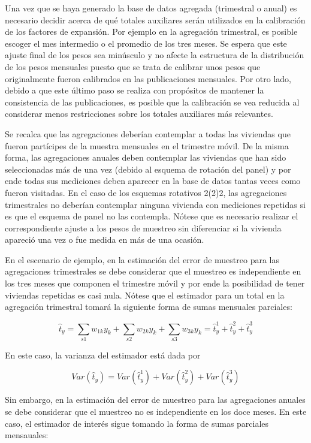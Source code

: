 \documentclass[
  10pt,
  spanish,
]{book}
\begin{document}
Una vez que se haya generado la base de datos agregada (trimestral o
anual) es necesario decidir acerca de qué totales auxiliares serán
utilizados en la calibración de los factores de expansión. Por ejemplo
en la agregación trimestral, es posible escoger el mes intermedio o el
promedio de los tres meses. Se espera que este ajuste final de los pesos
sea minúsculo y no afecte la estructura de la distribución de los pesos
mensuales puesto que se trata de calibrar unos pesos que originalmente
fueron calibrados en las publicaciones mensuales. Por otro lado, debido
a que este último paso se realiza con propósitos de mantener la
consistencia de las publicaciones, es posible que la calibración se vea
reducida al considerar menos restricciones sobre los totales auxiliares
más relevantes.

Se recalca que las agregaciones deberían contemplar a todas las
viviendas que fueron partícipes de la muestra mensuales en el trimestre
móvil. De la misma forma, las agregaciones anuales deben contemplar las
viviendas que han sido seleccionadas más de una vez (debido al esquema
de rotación del panel) y por ende todas sus mediciones deben aparecer en
la base de datos tantas veces como fueron visitadas. En el caso de los
esquemas rotativos 2(2)2, las agregaciones trimestrales no deberían
contemplar ninguna vivienda con mediciones repetidas si es que el
esquema de panel no las contempla. Nótese que es necesario realizar el
correspondiente ajuste a los pesos de muestreo sin diferenciar si la
vivienda apareció una vez o fue medida en más de una ocasión.

En el escenario de ejemplo, en la estimación del error de muestreo para
las agregaciones trimestrales se debe considerar que el muestreo es
independiente en los tres meses que componen el trimestre móvil y por
ende la posibilidad de tener viviendas repetidas es casi nula. Nótese
que el estimador para un total en la agregación trimestral tomará la
siguiente forma de sumas mensuales parciales:

\[
\hat{t}_y 
= \sum_{s1} w_{1k} y_k + \sum_{s2} w_{2k} y_k + \sum_{s3} w_{3k} y_k
= \hat{t}_{y}^1 + \hat{t}_{y}^2 + \hat{t}_{y}^3
\]

En este caso, la varianza del estimador está dada por

\[
Var(\hat{t}_y)
= Var(\hat{t}_{y}^1) + Var(\hat{t}_{y}^2) + Var(\hat{t}_{y}^3)
\]

Sin embargo, en la estimación del error de muestreo para las
agregaciones anuales se debe considerar que el muestreo no es
independiente en los doce meses. En este caso, el estimador de interés
sigue tomando la forma de sumas parciales mensauales:
\end{document}
